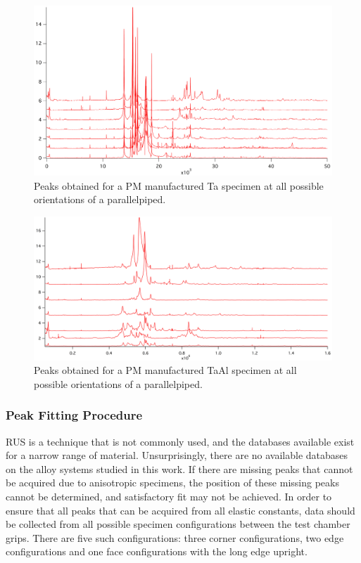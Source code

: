 %
\begin{figure}[H]
\begin{center}
\includegraphics[width=16cm]{RUS_santa_pm}
\caption{Peaks obtained for a PM manufactured Ta specimen at all possible orientations of a parallelpiped.}
\label{fig:rus_santa_pm}
\end{center}
\end{figure}
%


%
\begin{figure}[H]
\begin{center}
\includegraphics[width=16cm]{RUS_santaal_pm}
\caption{Peaks obtained for a PM manufactured TaAl specimen at all possible orientations of a parallelpiped.}
\label{fig:rus_santaal_pm}
\end{center}
\end{figure}
%



\subsubsection{Peak Fitting Procedure}

RUS is a technique that is not commonly used, and the databases available exist for a narrow range of material.  Unsurprisingly, there are no available databases on the alloy systems studied in this work.  If there are missing peaks that cannot be acquired due to anisotropic specimens, the position of these missing peaks cannot be determined, and satisfactory fit may not be achieved.  In order to ensure that all peaks that can be acquired from all elastic constants, data should be collected from all possible specimen configurations between the test chamber grips.  There are five such configurations: three corner configurations, two edge configurations and one face configurations with the long edge upright.

